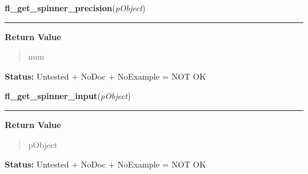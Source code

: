 \hspace{.8\funcindent}\begin{boxedminipage}{\funcwidth}

    \raggedright \textbf{fl\_get\_spinner\_precision}(\textit{pObject})

    \vspace{-1.5ex}

    \rule{\textwidth}{0.5\fboxrule}
\setlength{\parskip}{2ex}
\setlength{\parskip}{1ex}
      \textbf{Return Value}
    \vspace{-1ex}

      \begin{quote}
      num

      \end{quote}

\textbf{Status:} Untested + NoDoc + NoExample = NOT OK



    \end{boxedminipage}

    \label{xformslib:library:fl_get_spinner_input}

    \vspace{0.5ex}

\hspace{.8\funcindent}\begin{boxedminipage}{\funcwidth}

    \raggedright \textbf{fl\_get\_spinner\_input}(\textit{pObject})

    \vspace{-1.5ex}

    \rule{\textwidth}{0.5\fboxrule}
\setlength{\parskip}{2ex}
\setlength{\parskip}{1ex}
      \textbf{Return Value}
    \vspace{-1ex}

      \begin{quote}
      pObject

      \end{quote}

\textbf{Status:} Untested + NoDoc + NoExample = NOT OK



    \end{boxedminipage}

    \label{xformslib:library:fl_get_spinner_up_button}

